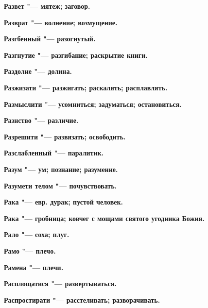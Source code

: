 \begin{multicols}{2}
\bfseries Развет\normalfont{} "--- мятеж; заговор. 




\bfseries Разврат\normalfont{} "--- волнение; возмущение. 




\bfseries Разгбенный\normalfont{} "--- разогнутый. 




\bfseries Разгнутие\normalfont{} "--- разгибание; раскрытие книги. 




\bfseries Раздолие\normalfont{} "--- долина. 




\bfseries Разжизати\normalfont{} "--- разжигать; раскалять; расплавлять. 




\bfseries Размыслити\normalfont{} "--- усомниться; задуматься; остановиться. 




\bfseries Разнство\normalfont{} "--- различие. 




\bfseries Разрешити\normalfont{} "--- развязать; освободить. 




\bfseries Разслабленный\normalfont{} "--- паралитик. 




\bfseries Разум\normalfont{} "--- ум; познание; разумение. 




\bfseries Разумети телом\normalfont{} "--- почувствовать. 




\bfseries Рака\normalfont{} "--- евр. дурак; пустой человек. 




\bfseries Рака\normalfont{} "--- гробница; ковчег с мощами святого угодника Божия. 




\bfseries Рало\normalfont{} "--- соха; плуг. 




\bfseries Рамо\normalfont{} "--- плечо. 




\bfseries Рамена\normalfont{} "--- плечи. 




\bfseries Расплощатися\normalfont{} "--- развертываться. 




\bfseries Распростирати\normalfont{} "--- расстеливать; разворачивать. 





\end{multicols}
